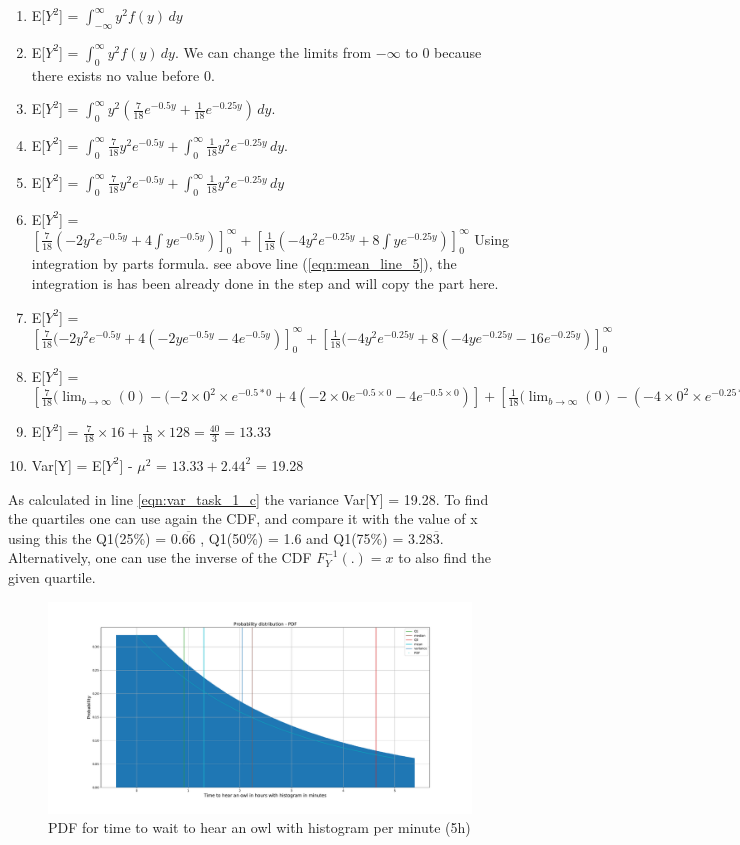\begin{enumerate}
    \item E[$Y^2$] = $\int_{-\infty}^{\infty}y^2f(y)\,dy$
    \item E[$Y^2$] = $\int_{0}^{\infty} y^2f(y)\,dy$.  We can change the limits from $-\infty$ to 0 because there exists no value before 0.
    \item E[$Y^2$] = $\int_{0}^{\infty} y^2(\frac{7}{18}e^{-0.5y} + \frac{1}{18}e^{-0.25y})\,dy$.
    \item E[$Y^2$] = $\int_{0}^{\infty} \frac{7}{18}y^2e^{-0.5y} + \int_{0}^{\infty} \frac{1}{18}y^2e^{-0.25y}\,dy$.
    \item E[$Y^2$] = $\int_{0}^{\infty} \frac{7}{18}y^2e^{-0.5y} + \int_{0}^{\infty} \frac{1}{18}y^2e^{-0.25y}\,dy$
    \item E[$Y^2$] = $[\frac{7}{18}(-2y^2e^{-0.5y}+4\int ye^{-0.5y})]_0^\infty + [\frac{1}{18}(-4y^2e^{-0.25y}+8\int ye^{-0.25y})]_0^\infty$ Using integration by parts formula. see above line (\ref{eqn:mean_line_5}), the integration is has been already done in the step and will copy the part here.
    \item E[$Y^2$] = $[\frac{7}{18}(-2y^2e^{-0.5y} +4(-2ye^{-0.5y}-4e^{-0.5y})]_0^\infty + [\frac{1}{18}(-4y^2e^{-0.25y} +8(-4ye^{-0.25y}-16e^{-0.25y})]_0^\infty$
    \item E[$Y^2$] = $[\frac{7}{18}(\lim_{b\to\infty}(0)-(-2\times 0^2 \times e^{-0.5*0} +4(-2\times0e^{-0.5\times0}-4e^{-0.5\times0})] + [\frac{1}{18}(\lim_{b\to\infty}(0)-(-4\times0^2 \times e^{-0.25*0} )+8(-4\times0 \times e^{-0.25\times 0}-16e^{-0.25*0})]$
    \item E[$Y^2$] = $\frac{7}{18}\times 16 + \frac{1}{18}\times 128 = \frac{40}{3}= 13.33$
    \item Var[Y] = E[$Y^2$] - $\mu^2$ = $13.33 + 2.44^2$ = 19.28 \label{eqn:var_task_1_c}
\end{enumerate}
As calculated in line \ref{eqn:var_task_1_c} the variance Var[Y] = 19.28. To find the quartiles one can use again the CDF, and compare it with the value of x using this the Q1(25\%) = $0.\overline{66}$ , Q1(50\%) = 1.6 and Q1(75\%) = $3.28\overline{3}$. Alternatively, one can use the inverse of the CDF $F_{Y}^{-1} (.)=x$ to also find the given quartile.

\begin{figure}[h!]
\centering
\includegraphics[width=\textwidth]{pics/task_1_c_pdf.pdf}
\caption{PDF for time to wait to hear an owl with histogram per minute (5h)}\label{fig:task_1_c}
\end{figure}
\FloatBarrier    

